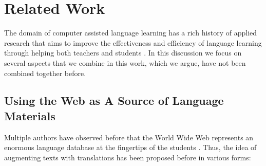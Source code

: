\newpage
\section{Related Work}

The domain of computer assisted language learning has a rich history of applied research that aims to improve the effectiveness and efficiency of language learning through helping both teachers and students \cite{levy2013call}. In this discussion we focus on several aspects that we combine in this work, which we argue, have not been combined together before.


\subsection{Using the Web as A Source of Language Materials}

Multiple authors have observed before that the World Wide Web represents an enormous language database at the fingertips of the students \cite{Fried08-Learner,Hira07-WebCorpora}. 
Thus, the idea of augmenting texts with translations has been proposed before in various forms: 

